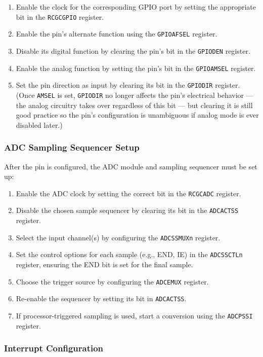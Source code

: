 \begin{enumerate}[nosep]
\item Enable the clock for the corresponding GPIO port by setting the appropriate bit in the \texttt{RCGCGPIO} register.
\item Enable the pin's alternate function using the \texttt{GPIOAFSEL} register.
\item Disable its digital function by clearing the pin's bit in the \texttt{GPIODEN} register.
\item Enable the analog function by setting the pin's bit in the \texttt{GPIOAMSEL} register.
\item Set the pin direction as input by clearing its bit in the \texttt{GPIODIR} register. (Once \texttt{AMSEL} is set, \texttt{GPIODIR} no longer affects the pin's electrical behavior — the analog circuitry takes over regardless of this bit — but clearing it is still good practice so the pin's configuration is unambiguous if analog mode is ever disabled later.)
\end{enumerate}

\subsubsection{ADC Sampling Sequencer Setup}

After the pin is configured, the ADC module and sampling sequencer must be set up:

\begin{enumerate}[nosep]
\item Enable the ADC clock by setting the correct bit in the \texttt{RCGCADC} register.
\item Disable the chosen sample sequencer by clearing its bit in the \texttt{ADCACTSS} register.
\item Select the input channel(s) by configuring the \texttt{ADCSSMUXn} register.
\item Set the control options for each sample (e.g., END, IE) in the \texttt{ADCSSCTLn} register, ensuring the END bit is set for the final sample.
\item Choose the trigger source by configuring the \texttt{ADCEMUX} register.
\item Re-enable the sequencer by setting its bit in \texttt{ADCACTSS}.
\item If processor-triggered sampling is used, start a conversion using the \texttt{ADCPSSI} register.
\end{enumerate}

\subsubsection{Interrupt Configuration}


